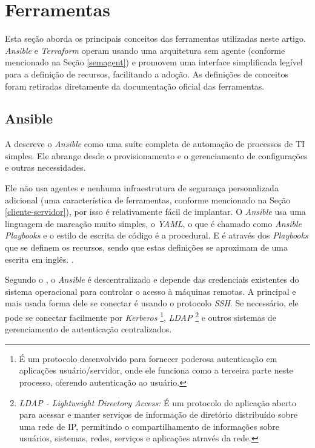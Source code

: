 \section{Ferramentas}

Esta seção aborda os principais conceitos das ferramentas utilizadas neste artigo. \textit{Ansible} e \textit{Terraform} operam usando uma arquitetura sem agente (conforme mencionado na Seção \ref{semagent}) e promovem uma interface simplificada legível para a definição de recursos, facilitando a adoção. As definições de conceitos foram retiradas diretamente da documentação oficial das ferramentas.

\subsection{Ansible} \label{Ansible}

A  descreve o \textit{Ansible} como uma suíte completa de automação de processos de TI simples. Ele abrange desde o provisionamento e o gerenciamento de configurações e outras necessidades.

Ele não usa agentes e nenhuma infraestrutura de segurança personalizada adicional (uma característica de ferramentas, conforme mencionado na Seção \ref{cliente-servidor}), por isso é relativamente fácil de implantar. O \textit{Ansible} usa uma linguagem de marcação muito simples, o \textit{YAML}, o que é chamado como \textit{Ansible Playbooks} e o estilo de escrita de código é a procedural. E é através dos \textit{Playbooks} que se definem os recursos, sendo que estas definições se aproximam de uma escrita em inglês. \cite{redhat}.

Segundo o , o \textit{Ansible} é descentralizado e depende das credenciais existentes do sistema operacional para controlar o acesso à máquinas remotas. A principal e mais usada forma dele se conectar é usando o protocolo \textit{SSH}. Se necessário, ele pode se conectar facilmente por \textit{Kerberos} \footnote{É um protocolo desenvolvido para fornecer poderosa autenticação em aplicações usuário/servidor, onde ele funciona como a terceira parte neste processo, oferendo autenticação ao usuário.}, \textit{LDAP} \footnote{\textit{LDAP - Lightweight Directory Access:} É um protocolo de aplicação aberto para acessar e manter serviços de informação de diretório distribuído sobre uma rede de IP, permitindo o compartilhamento de informações sobre usuários, sistemas, redes, serviços e aplicações através da rede.} e outros sistemas de gerenciamento de autenticação centralizados.


